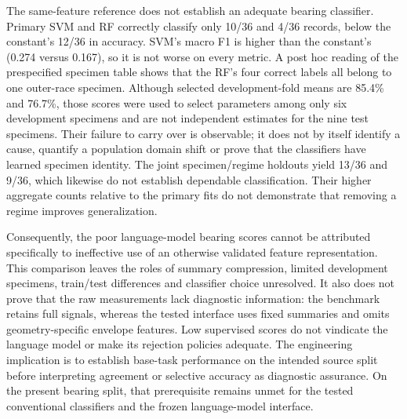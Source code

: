 \documentclass[11pt,a4paper]{article}
\begin{document}
The same-feature reference does not establish an adequate bearing classifier. Primary SVM and RF correctly classify only 10/36 and 4/36 records, below the constant's 12/36 in accuracy. SVM's macro F1 is higher than the constant's (0.274 versus 0.167), so it is not worse on every metric. A post hoc reading of the prespecified specimen table shows that the RF's four correct labels all belong to one outer-race specimen. Although selected development-fold means are 85.4\% and 76.7\%, those scores were used to select parameters among only six development specimens and are not independent estimates for the nine test specimens. Their failure to carry over is observable; it does not by itself identify a cause, quantify a population domain shift or prove that the classifiers have learned specimen identity. The joint specimen/regime holdouts yield 13/36 and 9/36, which likewise do not establish dependable classification. Their higher aggregate counts relative to the primary fits do not demonstrate that removing a regime improves generalization.

Consequently, the poor language-model bearing scores cannot be attributed specifically to ineffective use of an otherwise validated feature representation. This comparison leaves the roles of summary compression, limited development specimens, train/test differences and classifier choice unresolved. It also does not prove that the raw measurements lack diagnostic information: the benchmark retains full signals, whereas the tested interface uses fixed summaries and omits geometry-specific envelope features. Low supervised scores do not vindicate the language model or make its rejection policies adequate. The engineering implication is to establish base-task performance on the intended source split before interpreting agreement or selective accuracy as diagnostic assurance. On the present bearing split, that prerequisite remains unmet for the tested conventional classifiers and the frozen language-model interface.

\FloatBarrier




\begingroup
\small\raggedright
{}


\endgroup
\end{document}
